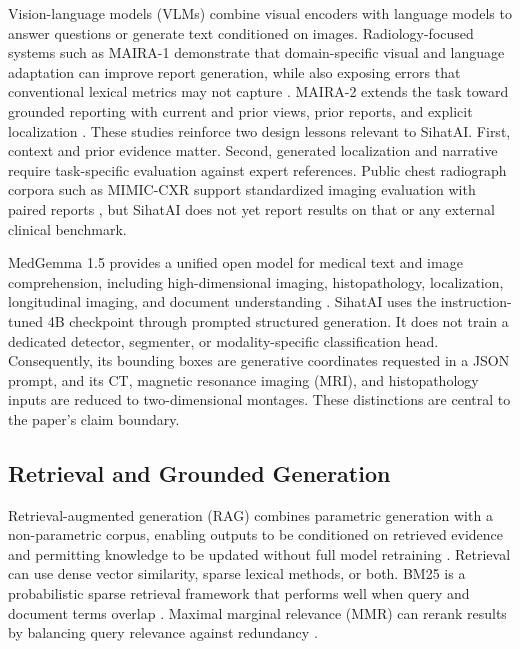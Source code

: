 \documentclass[conference]{IEEEtran}
\begin{document}
Vision-language models (VLMs) combine visual encoders with language models to answer questions or generate text conditioned on images. Radiology-focused systems such as MAIRA-1 demonstrate that domain-specific visual and language adaptation can improve report generation, while also exposing errors that conventional lexical metrics may not capture \cite{bannur2024maira1}. MAIRA-2 extends the task toward grounded reporting with current and prior views, prior reports, and explicit localization \cite{bannur2024maira2}. These studies reinforce two design lessons relevant to SihatAI. First, context and prior evidence matter. Second, generated localization and narrative require task-specific evaluation against expert references. Public chest radiograph corpora such as MIMIC-CXR support standardized imaging evaluation with paired reports \cite{johnson2019mimiccxr}, but SihatAI does not yet report results on that or any external clinical benchmark.

MedGemma 1.5 provides a unified open model for medical text and image comprehension, including high-dimensional imaging, histopathology, localization, longitudinal imaging, and document understanding \cite{sellergren2026medgemma,googlemedgemmacard}. SihatAI uses the instruction-tuned 4B checkpoint through prompted structured generation. It does not train a dedicated detector, segmenter, or modality-specific classification head. Consequently, its bounding boxes are generative coordinates requested in a JSON prompt, and its CT, magnetic resonance imaging (MRI), and histopathology inputs are reduced to two-dimensional montages. These distinctions are central to the paper's claim boundary.

\subsection{Retrieval and Grounded Generation}

Retrieval-augmented generation (RAG) combines parametric generation with a non-parametric corpus, enabling outputs to be conditioned on retrieved evidence and permitting knowledge to be updated without full model retraining \cite{lewis2020rag}. Retrieval can use dense vector similarity, sparse lexical methods, or both. BM25 is a probabilistic sparse retrieval framework that performs well when query and document terms overlap \cite{robertson2009bm25}. Maximal marginal relevance (MMR) can rerank results by balancing query relevance against redundancy \cite{carbonell1998mmr}.
\end{document}

